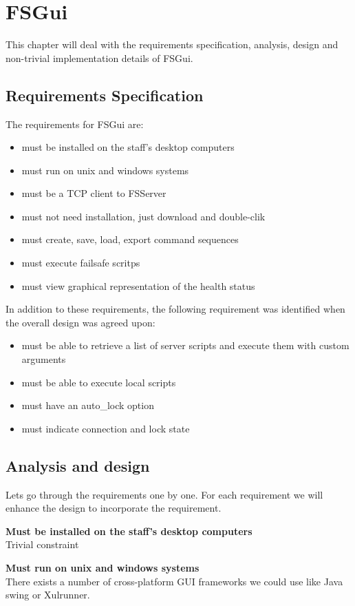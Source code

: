\chapter{FSGui}
\label{chap:fsgui}
This chapter will deal with the requirements specification, analysis, design and non-trivial implementation details of FSGui.

\section{Requirements Specification}
The requirements for FSGui are:
\begin{itemize}
	\item must be installed on the staff's desktop computers
	\item must run on unix and windows systems
	\item must be a TCP client to FSServer
	\item must not need installation, just download and double-clik
	\item must create, save, load, export command sequences
	\item must execute failsafe scritps
	\item must view graphical representation of the health status
\end{itemize}
In addition to these requirements, the following requirement was identified when the overall design was agreed upon:
\begin{itemize}
	\item must be able to retrieve a list of server scripts and execute them with custom arguments
	\item must be able to execute local scripts
	\item must have an auto\_lock option
	\item must indicate connection and lock state
\end{itemize}

\section{Analysis and design}
Lets go through the requirements one by one. For each requirement we will enhance the design to incorporate the requirement.

\textbf{Must be installed on the staff's desktop computers} \\
Trivial constraint

\textbf{Must run on unix and windows systems} \\
There exists a number of cross-platform GUI frameworks we could use like Java swing or Xulrunner.

